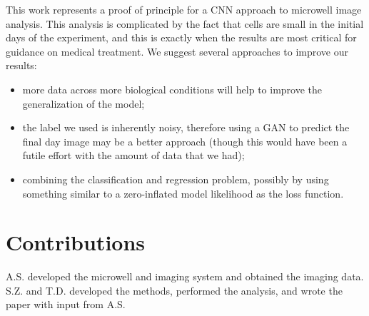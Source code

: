 \documentclass[10pt,twocolumn,letterpaper]{article}
\begin{document}
This work represents a proof of principle for a CNN approach to microwell image analysis.  This analysis is complicated by the fact that cells are small in the initial days of the experiment, and this is exactly when the results are most critical for guidance on medical treatment.  We suggest several approaches to improve our results:
\begin{itemize}
\item more data across more biological conditions will help to improve the generalization of the model;
\item the label we used is inherently noisy, therefore using a GAN to predict the final day image may be a better approach (though this would have been a futile effort with the amount of data that we had);
\item combining the classification and regression problem, possibly by using something similar to a zero-inflated model likelihood as the loss function.
\end{itemize}







{\small


}

\section{Contributions}

A.S. developed the microwell and imaging system and obtained the imaging data.  S.Z. and T.D. developed the methods, performed the analysis, and wrote the paper with input from A.S.  
\end{document}
